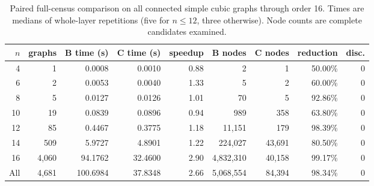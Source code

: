 \begin{table}[t]
\centering
\caption{Paired full-census comparison on all connected simple cubic graphs through order 16. Times are medians of whole-layer repetitions (five for $n\leq 12$, three otherwise). Node counts are complete candidates examined.}
\label{tab:solver-bc-census}
\small
\begin{tabular}{rrrrrrrrr}
\toprule
$n$ & graphs & B time (s) & C time (s) & speedup & B nodes & C nodes & reduction & disc. \\
\midrule
4  & 1    & 0.0008 & 0.0010 & 0.88 & 2         & 1      & 50.00\% & 0 \\
6  & 2    & 0.0053 & 0.0040 & 1.33 & 5         & 2      & 60.00\% & 0 \\
8  & 5    & 0.0127 & 0.0126 & 1.01 & 70        & 5      & 92.86\% & 0 \\
10 & 19   & 0.0839 & 0.0896 & 0.94 & 989       & 358    & 63.80\% & 0 \\
12 & 85   & 0.4467 & 0.3775 & 1.18 & 11,151    & 179    & 98.39\% & 0 \\
14 & 509  & 5.9727 & 4.8901 & 1.22 & 224,027   & 43,691 & 80.50\% & 0 \\
16 & 4,060& 94.1762& 32.4600& 2.90 & 4,832,310 & 40,158 & 99.17\% & 0 \\
\midrule
All & 4,681 & 100.6984 & 37.8348 & 2.66 & 5,068,554 & 84,394 & 98.34\% & 0 \\
\bottomrule
\end{tabular}
\end{table}
